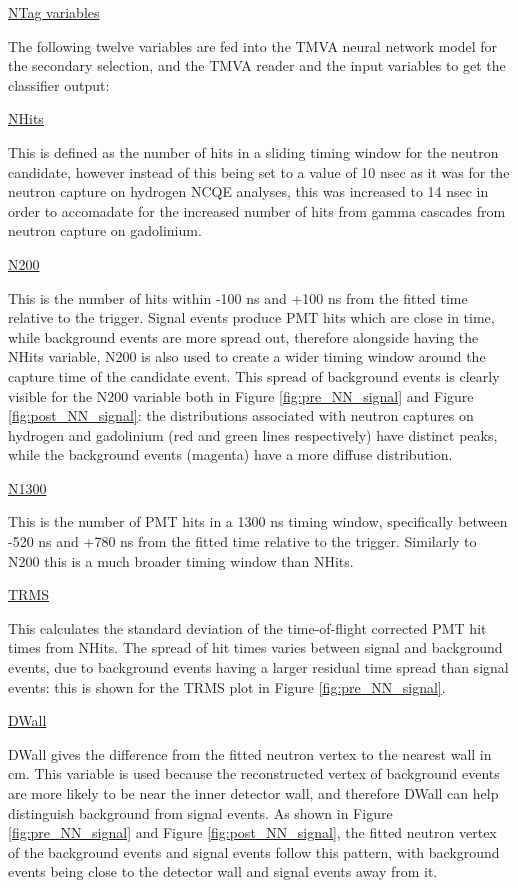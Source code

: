 \underline{NTag variables}

The following twelve variables are fed into the TMVA neural network model for the secondary selection, and the TMVA reader and the input variables to get the classifier output:

\underline{NHits}

This is defined as the number of hits in a sliding timing window for the neutron candidate, however instead of this being set to a value of 10 nsec as it was for the neutron capture on hydrogen NCQE analyses, this was increased to 14 nsec in order to accomadate for the increased number of hits from gamma cascades from neutron capture on gadolinium.

\underline{N200}

This is the number of hits within -100 ns and +100 ns from the fitted time relative to the trigger. Signal events produce PMT hits which are close in time, while background events are more spread out, therefore alongside having the NHits variable, N200 is also used to create a wider timing window around the capture time of the candidate event. This spread of background events is clearly visible for the N200 variable both in Figure \ref{fig:pre_NN_signal} and Figure \ref{fig:post_NN_signal}: the distributions associated with neutron captures on hydrogen and gadolinium (red and green lines respectively) have distinct peaks, while the background events (magenta) have a more diffuse distribution. 

\underline{N1300}

This is the number of PMT hits in a 1300 ns timing window, specifically between -520 ns and +780 ns from the fitted time relative to the trigger. Similarly to N200 this is a much broader timing window than NHits.    

\underline{TRMS}

This calculates the standard deviation of the time-of-flight corrected PMT hit times from NHits. The spread of hit times varies between signal and background events, due to background events having a larger residual time spread than signal events: this is shown for the TRMS plot in Figure \ref{fig:pre_NN_signal}.

\underline{DWall}

DWall gives the difference from the fitted neutron vertex to the nearest wall in cm. This variable is used because the reconstructed vertex of background events are more likely to be near the inner detector wall, and therefore DWall can help distinguish background from signal events. As shown in Figure \ref{fig:pre_NN_signal} and Figure \ref{fig:post_NN_signal}, the fitted neutron vertex of the background events and signal events follow this pattern, with background events being close to the detector wall and signal events away from it.

